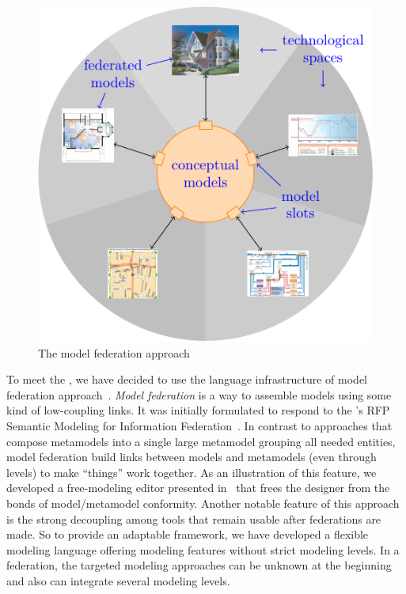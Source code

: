 

\begin{figure}[t]
    \centering
    \includegraphics[width=\columnwidth]{Figures/federation.pdf}
    \caption{The model federation approach}
    \label{fig:mf}
\end{figure}

To meet the \mlpc, we have decided to use the language infrastructure of
model federation approach~\parencite{Golra2016-federation}. \emph{Model
  federation} is a way to assemble models using some kind of
low-coupling links. It was initially  formulated to respond to the \OMG's RFP
Semantic Modeling for Information Federation~\parencite{simf}. In
contrast to approaches that compose metamodels into a single large
metamodel grouping all needed entities, model federation build links
between models and metamodels (even through levels) to make ``things''
work together. As an illustration of this feature, we developed a
free-modeling editor presented
in~\parencite{models2016-freemodel} that frees the designer from the bonds of
model/metamodel conformity. Another notable feature of
this approach is the strong decoupling among tools that remain usable
after federations are made.
So to provide an adaptable framework, we have developed a flexible modeling language offering modeling features without strict modeling levels. In a federation, the targeted modeling approaches can be unknown at the beginning and also can integrate several modeling levels.


